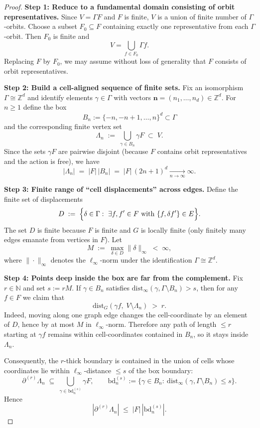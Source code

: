 \documentclass[a4paper,11pt]{article}
\theoremstyle{plain}
\theoremstyle{definition}
\theoremstyle{remark}
\newcommand{\1}{\mathbf{1}}
\begin{document}
\begin{proof}
\textbf{Step 1: Reduce to a fundamental domain consisting of orbit representatives.}
Since $V=\Gamma F$ and $F$ is finite, $V$ is a union of finite number of $\Gamma$-orbits.
Choose a subset $F_0\subseteq F$ containing exactly one representative from each $\Gamma$-orbit.
Then $F_0$ is finite and
\[
V=\bigcup_{f\in F_0}\Gamma f.
\]
Replacing $F$ by $F_0$, we may assume without loss of generality that $F$ consists of orbit
representatives.

\smallskip
\textbf{Step 2: Build a cell-aligned sequence of finite sets.}
Fix an isomorphism $\Gamma\cong \mathbb{Z}^d$ and identify elements $\gamma\in\Gamma$ with vectors
$\mathbf{n}=(n_1,\dots,n_d)\in\mathbb{Z}^d$. For $n\ge 1$ define the box
\[
B_n:=\{-n,-n+1,\dots,n\}^d\subset \Gamma
\]
and the corresponding finite vertex set
\[
\Lambda_n \;:=\; \bigcup_{\gamma\in B_n} \gamma F \;\subset\; V.
\]
Since the sets $\gamma F$ are pairwise disjoint (because $F$ contains orbit representatives and
the action is free), we have
\[
|\Lambda_n| \;=\; |F|\,|B_n| \;=\; |F|\,(2n+1)^d \xrightarrow[n\to\infty]{}\infty.
\]

\smallskip
\textbf{Step 3: Finite range of ``cell displacements'' across edges.}
Define the finite set of displacements
\[
D\;:=\;\Bigl\{\delta\in\Gamma:\ \exists f,f'\in F \text{ with } \{f,\delta f'\}\in E\Bigr\}.
\]
The set $D$ is finite because $F$ is finite and $G$ is locally finite (only finitely many edges
emanate from vertices in $F$). Let
\[
M \;:=\; \max_{\delta\in D}\|\delta\|_\infty \;<\;\infty,
\]
where $\|\cdot\|_\infty$ denotes the $\ell_\infty$-norm under the identification $\Gamma\cong\mathbb{Z}^d$.

\smallskip
\textbf{Step 4: Points deep inside the box are far from the complement.}
Fix $r\in\mathbb{N}$ and set $s:=rM$. If $\gamma\in B_n$ satisfies
$\mathrm{dist}_\infty(\gamma,\Gamma\setminus B_n)>s$, then for any $f\in F$ we claim that
\[
\mathrm{dist}_G(\gamma f,\; V\setminus \Lambda_n) \;>\; r.
\]
Indeed, moving along one graph edge changes the cell-coordinate by an element of $D$, hence by
at most $M$ in $\ell_\infty$-norm. Therefore any path of length $\le r$ starting at $\gamma f$
remains within cell-coordinates contained in $B_n$, so it stays inside $\Lambda_n$.

Consequently, the $r$-thick boundary is contained in the union of cells whose coordinates lie
within $\ell_\infty$-distance $\le s$ of the box boundary:
\[
\partial^{(r)}\Lambda_n \;\subseteq\; \bigcup_{\gamma\in \mathrm{bd}_n^{(s)}} \gamma F,
\qquad
\mathrm{bd}_n^{(s)}:=\{\gamma\in B_n:\ \mathrm{dist}_\infty(\gamma,\Gamma\setminus B_n)\le s\}.
\]
Hence
\[
|\partial^{(r)}\Lambda_n|
\;\le\;
|F|\,|\mathrm{bd}_n^{(s)}|.
\]


\end{proof}
\end{document}
